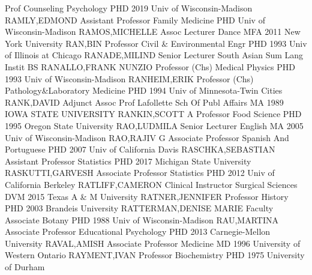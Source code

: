 \documentclass[
]{article}
\begin{document}
Prof \textbar Counseling Psychology \textbar PHD 2019 Univ of
Wisconsin-Madison \textbar{}  \textbar RAMLY,EDMOND
\textbar Assistant Professor \textbar Family Medicine \textbar PHD Univ
of Wisconsin-Madison \textbar{}  \textbar RAMOS,MICHELLE
\textbar Assoc Lecturer \textbar Dance \textbar MFA 2011 New York
University \textbar{}  \textbar RAN,BIN \textbar Professor
\textbar Civil \& Environmental Engr \textbar PHD 1993 Univ of Illinois
at Chicago \textbar{}  \textbar RANADE,MILIND
\textbar Senior Lecturer \textbar South Asian Sum Lang Instit
\textbar BS \textbar{}  \textbar RANALLO,FRANK NUNZIO
\textbar Professor (Chs) \textbar Medical Physics \textbar PHD 1993 Univ
of Wisconsin-Madison \textbar{}  \textbar RANHEIM,ERIK
\textbar Professor (Chs) \textbar Pathology\&Laboratory Medicine
\textbar PHD 1994 Univ of Minnesota-Twin Cities \textbar{} 
\textbar RANK,DAVID \textbar Adjunct Assoc Prof \textbar Lafollette Sch
Of Publ Affairs \textbar MA 1989 IOWA STATE UNIVERSITY \textbar{}
 \textbar RANKIN,SCOTT A \textbar Professor \textbar Food
Science \textbar PHD 1995 Oregon State University \textbar{}
 \textbar RAO,LUDMILA \textbar Senior Lecturer
\textbar English \textbar MA 2005 Univ of Wisconsin-Madison \textbar{}
 \textbar RAO,RAJIV G \textbar Associate Professor
\textbar Spanish And Portuguese \textbar PHD 2007 Univ of California
Davis \textbar{}  \textbar RASCHKA,SEBASTIAN
\textbar Assistant Professor \textbar Statistics \textbar PHD 2017
Michigan State University \textbar{} 
\textbar RASKUTTI,GARVESH \textbar Associate Professor
\textbar Statistics \textbar PHD 2012 Univ of California Berkeley
\textbar{}  \textbar RATLIFF,CAMERON \textbar Clinical
Instructor \textbar Surgical Sciences \textbar DVM 2015 Texas A \& M
University \textbar{}  \textbar RATNER,JENNIFER
\textbar Professor \textbar History \textbar PHD 2003 Brandeis
University \textbar{}  \textbar RATTERMAN,DENISE MARIE
\textbar Faculty Associate \textbar Botany \textbar PHD 1988 Univ of
Wisconsin-Madison \textbar{}  \textbar RAU,MARTINA
\textbar Associate Professor \textbar Educational Psychology
\textbar PHD 2013 Carnegie-Mellon University \textbar{} 
\textbar RAVAL,AMISH \textbar Associate Professor \textbar Medicine
\textbar MD 1996 University of Western Ontario \textbar{} 
\textbar RAYMENT,IVAN \textbar Professor \textbar Biochemistry
\textbar PHD 1975 University of Durham \textbar{} 
\end{document}
